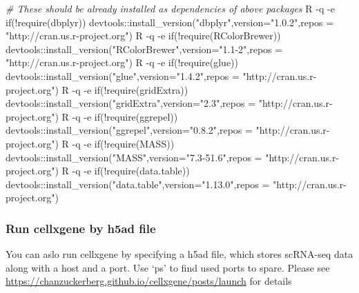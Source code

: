 \documentclass[
]{article}
\newenvironment{Shaded}{\begin{snugshade}}{\end{snugshade}}
\newcommand{\AttributeTok}[1]{\textcolor[rgb]{0.77,0.63,0.00}{#1}}
\newcommand{\CommentTok}[1]{\textcolor[rgb]{0.56,0.35,0.01}{\textit{#1}}}
\newcommand{\ExtensionTok}[1]{#1}
\newcommand{\StringTok}[1]{\textcolor[rgb]{0.31,0.60,0.02}{#1}}
\begin{document}
\begin{Shaded}
\begin{Highlighting}[]
\CommentTok{\# These should be already installed as dependencies of above packages}
\ExtensionTok{R} \AttributeTok{{-}q} \AttributeTok{{-}e} \StringTok{\textquotesingle{}if(!require(dbplyr)) devtools::install\_version("dbplyr",version="1.0.2",repos = "http://cran.us.r{-}project.org")\textquotesingle{}}
\ExtensionTok{R} \AttributeTok{{-}q} \AttributeTok{{-}e} \StringTok{\textquotesingle{}if(!require(RColorBrewer)) devtools::install\_version("RColorBrewer",version="1.1{-}2",repos = "http://cran.us.r{-}project.org")\textquotesingle{}}
\ExtensionTok{R} \AttributeTok{{-}q} \AttributeTok{{-}e} \StringTok{\textquotesingle{}if(!require(glue)) devtools::install\_version("glue",version="1.4.2",repos = "http://cran.us.r{-}project.org")\textquotesingle{}}
\ExtensionTok{R} \AttributeTok{{-}q} \AttributeTok{{-}e} \StringTok{\textquotesingle{}if(!require(gridExtra)) devtools::install\_version("gridExtra",version="2.3",repos = "http://cran.us.r{-}project.org")\textquotesingle{}}
\ExtensionTok{R} \AttributeTok{{-}q} \AttributeTok{{-}e} \StringTok{\textquotesingle{}if(!require(ggrepel)) devtools::install\_version("ggrepel",version="0.8.2",repos = "http://cran.us.r{-}project.org")\textquotesingle{}}
\ExtensionTok{R} \AttributeTok{{-}q} \AttributeTok{{-}e} \StringTok{\textquotesingle{}if(!require(MASS)) devtools::install\_version("MASS",version="7.3{-}51.6",repos = "http://cran.us.r{-}project.org")\textquotesingle{}}
\ExtensionTok{R} \AttributeTok{{-}q} \AttributeTok{{-}e} \StringTok{\textquotesingle{}if(!require(data.table)) devtools::install\_version("data.table",version="1.13.0",repos = "http://cran.us.r{-}project.org")\textquotesingle{}}
\end{Highlighting}
\end{Shaded}

\hypertarget{run-cellxgene-by-h5ad-file}{%
\subsubsection{Run cellxgene by h5ad file}\label{run-cellxgene-by-h5ad-file}}

You can aslo run cellxgene by specifying a h5ad file, which stores scRNA-seq data along with a host and a port.
Use `ps' to find used ports to spare. Please see \url{https://chanzuckerberg.github.io/cellxgene/posts/launch} for details
\end{document}
